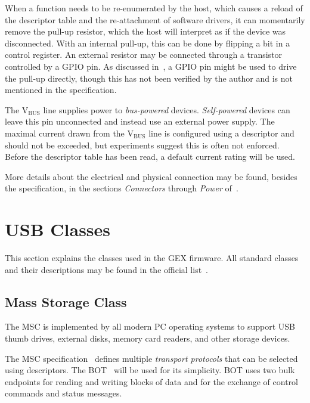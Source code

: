 When a function needs to be re-enumerated by the host, which causes a reload of the descriptor table and the re-attachment of software drivers, it can momentarily remove the pull-up resistor, which the host will interpret as if the device was disconnected. With an internal pull-up, this can be done by flipping a bit in a control register. An external resistor may be connected through a transistor controlled by a \gls{GPIO} pin. As discussed in~\cite{eev-gpio-pu}, a GPIO pin might be used to drive the pull-up directly, though this has not been verified by the author and is not mentioned in the specification.

The V$_\mathrm{BUS}$ line supplies power to \textit{bus-powered} devices. \textit{Self-powered} devices can leave this pin unconnected and instead use an external power supply. The maximal current drawn from the V$_\mathrm{BUS}$ line is configured using a descriptor and should not be exceeded, but experiments suggest this is often not enforced. Before the descriptor table has been read, a default current rating will be used.

More details about the electrical and physical connection may be found, besides the specification, in the sections \textit{Connectors} through \textit{Power} of~\cite{usb-nutshell}.

\section{USB Classes} \label{sec:usb_classes}

This section explains the classes used in the GEX firmware. All standard classes and their descriptions may be found in the official list~\cite{usb-class-list}.

\subsection{Mass Storage Class} \label{sec:msc}

The \gls{MSC} is implemented by all modern \gls{PC} operating systems to support \gls{USB} thumb drives, external disks, memory card readers, and other storage devices.


The \gls{MSC} specification~\cite{usbif-msco} defines multiple \textit{transport protocols} that can be selected using descriptors. The \gls{BOT}~\cite{usbif-bot} will be used for its simplicity. \gls{BOT} uses two bulk endpoints for reading and writing blocks of data and for the exchange of control commands and status messages.

